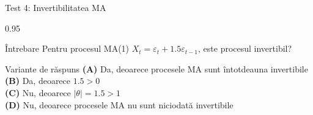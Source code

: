 \documentclass[9pt, aspectratio=169, t]{beamer}
\begin{document}
\begin{frame}{Test 4: Invertibilitatea MA}
    \begin{cminipage}{0.95\textwidth}
    \begin{alertblock}{Întrebare}
        Pentru procesul MA(1) $X_t = \varepsilon_t + 1.5\varepsilon_{t-1}$, este procesul invertibil?
    \end{alertblock}

    \vspace{0.5cm}
    \begin{block}{Variante de răspuns}
    \textcolor{MainBlue}{\textbf{(A)}} Da, deoarece procesele MA sunt întotdeauna invertibile\\[3pt]
    \textcolor{MainBlue}{\textbf{(B)}} Da, deoarece $1.5 > 0$\\[3pt]
    \textcolor{MainBlue}{\textbf{(C)}} Nu, deoarece $|\theta| = 1.5 > 1$\\[3pt]
    \textcolor{MainBlue}{\textbf{(D)}} Nu, deoarece procesele MA nu sunt niciodată invertibile
    \end{block}
    \end{cminipage}
\end{frame}
\end{document}
